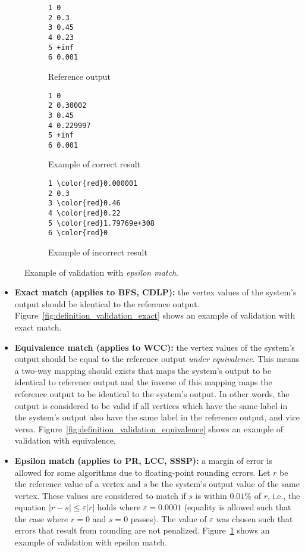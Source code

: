 \begin{figure}[h]
\centering
\begin{subfigure}{0.3\textwidth}
\begin{Verbatim}[frame=single]
1 0
2 0.3
3 0.45
4 0.23
5 +inf
6 0.001
\end{Verbatim}
\caption{Reference output}
\end{subfigure}
\begin{subfigure}{0.3\textwidth}
\begin{Verbatim}[frame=single]
1 0
2 0.30002
3 0.45
4 0.229997
5 +inf
6 0.001
\end{Verbatim}
\caption{Example of correct result}
\end{subfigure}
\begin{subfigure}{0.3\textwidth}
\begin{Verbatim}[frame=single,commandchars=\\\{\}]
1 \color{red}0.000001
2 0.3
3 \color{red}0.46
4 \color{red}0.22
5 \color{red}1.79769e+308
6 \color{red}0
\end{Verbatim}
\caption{Example of incorrect result}
\end{subfigure}
\caption{Example of validation with \emph{epsilon match}.}
\label{fig:definition_validation_epsilon}
\end{figure}


\begin{itemize}

\item \textbf{Exact match (applies to BFS, CDLP):} the vertex values of the system's output should be identical to the reference output. Figure~\ref{fig:definition_validation_exact} shows an example of validation with exact match.

\item \textbf{Equivalence match (applies to WCC):} the vertex values of the system's output should be equal to the reference output \emph{under equivalence}. This means a two-way mapping should exists that maps the system's output to be identical to reference output and the inverse of this mapping maps the reference output to be identical to the system's output. In other words, the output is considered to be valid if all vertices which have the same label in the system's output also have the same label in the reference output, and vice versa. Figure~\ref{fig:definition_validation_equivalence} shows an example of validation with equivalence.

\item \textbf{Epsilon match (applies to PR, LCC, SSSP):} a margin of error is allowed for some algorithms due to floating-point rounding errors. Let $r$ be the reference value of a vertex and $s$ be the system's output value of the same vertex. These values are considered to match if $s$ is within $0.01\%$ of $r$, i.e., the equation $|r-s| \leq \varepsilon |r|$ holds where $\varepsilon=0.0001$ (equality is allowed such that the case where $r = 0$ and $s = 0$ passes). The value of $\varepsilon$ was chosen such that errors that result from rounding are not penalized. Figure~\ref{fig:definition_validation_epsilon} shows an example of validation with epsilon match.
\end{itemize}

